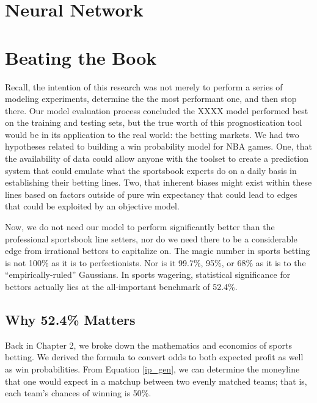 \documentclass [MS] {uclathes}
\begin{document}
\chapter{Neural Network}

\chapter{Beating the Book}

Recall, the intention of this research was not merely to perform a series of modeling experiments, determine the the most performant one, and then stop there. Our model evaluation process concluded the XXXX model performed best on the training and testing sets, but the true worth of this prognostication tool would be in its application to the real world: the betting markets. We had two hypotheses related to building a win probability model for NBA games. One, that the availability of data could allow anyone with the toolset to create a prediction system that could emulate what the sportsbook experts do on a daily basis in establishing their betting lines. Two, that inherent biases might exist within these lines based on factors outside of pure win expectancy that could lead to edges that could be exploited by an objective model.

Now, we do not need our model to perform significantly better than the professional sportsbook line setters, nor do we need there to be a considerable edge from irrational bettors to capitalize on. The magic number in sports betting is not 100\% as it is to perfectionists. Nor is it 99.7\%, 95\%, or 68\% as it is to the ``empirically-ruled'' Gaussians. In sports wagering, statistical significance for bettors actually lies at the all-important benchmark of 52.4\%. \cite{medium524}

\section{Why 52.4\% Matters}
Back in Chapter 2, we broke down the mathematics and economics of sports betting. We derived the formula to convert odds to both expected profit as well as win probabilities. From Equation \ref{ip_gen}, we can determine the moneyline that one would expect in a matchup between two evenly matched teams; that is, each team's chances of winning is 50\%. \\
\end{document}

